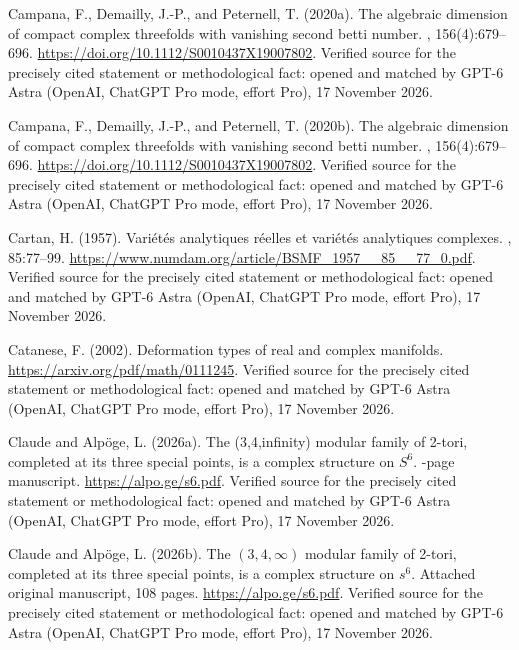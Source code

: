 \begin{thebibliography}{}
Campana, F., Demailly, J.-P., and Peternell, T. (2020a).
\newblock The algebraic dimension of compact complex threefolds with vanishing
  second betti number.
, 156(4):679--696.
\newblock \url{https://doi.org/10.1112/S0010437X19007802}. Verified source for the precisely cited statement or methodological fact: opened and matched by GPT-6 Astra (OpenAI, ChatGPT Pro mode, effort Pro), 17 November 2026.

Campana, F., Demailly, J.-P., and Peternell, T. (2020b).
\newblock The algebraic dimension of compact complex threefolds with vanishing
  second betti number.
, 156(4):679--696.
\newblock \url{https://doi.org/10.1112/S0010437X19007802}. Verified source for the precisely cited statement or methodological fact: opened and matched by GPT-6 Astra (OpenAI, ChatGPT Pro mode, effort Pro), 17 November 2026.

Cartan, H. (1957).
\newblock Vari\'et\'es analytiques r\'eelles et vari\'et\'es analytiques
  complexes.
, 85:77--99.
\newblock \url{https://www.numdam.org/article/BSMF_1957__85__77_0.pdf}. Verified source for the precisely cited statement or methodological fact: opened and matched by GPT-6 Astra (OpenAI, ChatGPT Pro mode, effort Pro), 17 November 2026.

Catanese, F. (2002).
\newblock Deformation types of real and complex manifolds.
\newblock \url{https://arxiv.org/pdf/math/0111245}. Verified source for the precisely cited statement or methodological fact: opened and matched by GPT-6 Astra (OpenAI, ChatGPT Pro mode, effort Pro), 17 November 2026.

{Claude} and Alp{\"o}ge, L. (2026a).
\newblock The (3,4,infinity) modular family of 2-tori, completed at its three
  special points, is a complex structure on {$S^6$}.
-page manuscript.
\newblock \url{https://alpo.ge/s6.pdf}. Verified source for the precisely cited statement or methodological fact: opened and matched by GPT-6 Astra (OpenAI, ChatGPT Pro mode, effort Pro), 17 November 2026.

{Claude} and Alp{\"o}ge, L. (2026b).
\newblock The $(3,4,\infty)$ modular family of 2-tori, completed at its three
  special points, is a complex structure on $s^6$.
\newblock Attached original manuscript, 108 pages.
\newblock \url{https://alpo.ge/s6.pdf}. Verified source for the precisely cited statement or methodological fact: opened and matched by GPT-6 Astra (OpenAI, ChatGPT Pro mode, effort Pro), 17 November 2026.


\end{thebibliography}
